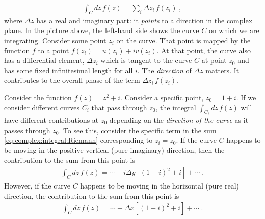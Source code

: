 \begin{align}
	\int_C dz\, f(z) = \sum_i \Delta z_i \, f(z_i) \ ,
	\label{eq:complex:integral:Riemann}
\end{align}
where $\Delta z$ has a real and imaginary part: it \emph{points} to a direction in the complex plane. In the picture above, the left-hand side shows the curve $C$ on which we are integrating. Consider some point $z_i$ on the curve. That point is mapped by the function $f$ to a point $f(z_i) = u(z_i)+iv(z_i)$. At that point, the curve also has a differential element, $\Delta z_i$ which is tangent to the curve $C$ at point $z_0$ and has some fixed infinitesimal length for all $i$. The \emph{direction} of $\Delta z$ matters. It contributes to the overall phase of the term $\Delta z_i \, f(z_i)$.
\begin{example}
Consider the function $f(z) = z^2+i$.  Consider a specific point, $z_0 = 1+i$. If we consider different curves $C_i$ that pass through $z_0$, the integral $\int_{C_i}dz\,f(z)$ will have different contributions at $z_0$ depending on the \emph{direction of the curve} as it passes through $z_0$. To see this, consider the specific term in the sum \eqref{eq:complex:integral:Riemann} corresponding to $z_i = z_0$. If the curve $C$ happens to be moving in the positive vertical (pure imaginary) direction, then the contribution to the sum from this point is
\begin{align}
	\int_C dz\, f(z) = \cdots + i\Delta y\left[(1+i)^2 + i\right] + \cdots \ .
\end{align}
However, if the curve $C$ happens to be moving in the horizontal (pure real) direction, the contribution to the sum from this point is
\begin{align}
	\int_C dz\, f(z) = \cdots + \Delta x\left[(1+i)^2 + i\right] + \cdots \ .
\end{align}
\end{example}
